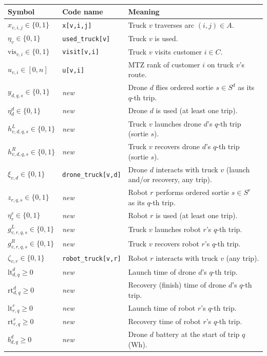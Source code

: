 \documentclass[10pt]{article}
\begin{document}
{\small
\begin{longtable}{@{}p{}p{}p{}@{}}
\toprule
Symbol & Code name & Meaning \\
\midrule
$x_{v,i,j}\in\{0,1\}$ & \texttt{x[v,i,j]} & Truck $v$ traverses arc $(i,j)\in A$. \\
$\eta_v\in\{0,1\}$ & \texttt{used\_truck[v]} & Truck $v$ is used. \\
$\mathrm{vis}_{v,i}\in\{0,1\}$ & \texttt{visit[v,i]} & Truck $v$ visits customer $i\in C$. \\
$u_{v,i}\in[0,n]$ & \texttt{u[v,i]} & MTZ rank of customer $i$ on truck $v$'s route. \\
$y_{d,q,s}\in\{0,1\}$ & \emph{new} & Drone $d$ flies ordered sortie $s\in S^d$ as its $q$-th trip. \\
$\eta^d_d\in\{0,1\}$ & \emph{new} & Drone $d$ is used (at least one trip). \\
$h^L_{v,d,q,s}\in\{0,1\}$ & \emph{new} & Truck $v$ launches drone $d$'s $q$-th trip (sortie $s$). \\
$h^R_{v,d,q,s}\in\{0,1\}$ & \emph{new} & Truck $v$ recovers drone $d$'s $q$-th trip (sortie $s$). \\
$\xi_{v,d}\in\{0,1\}$ & \texttt{drone\_truck[v,d]} & Drone $d$ interacts with truck $v$ (launch and/or recovery, any trip). \\
$z_{r,q,s}\in\{0,1\}$ & \emph{new} & Robot $r$ performs ordered sortie $s\in S^r$ as its $q$-th trip. \\
$\eta^r_r\in\{0,1\}$ & \emph{new} & Robot $r$ is used (at least one trip). \\
$g^L_{v,r,q,s}\in\{0,1\}$ & \emph{new} & Truck $v$ launches robot $r$'s $q$-th trip. \\
$g^R_{v,r,q,s}\in\{0,1\}$ & \emph{new} & Truck $v$ recovers robot $r$'s $q$-th trip. \\
$\zeta_{v,r}\in\{0,1\}$ & \texttt{robot\_truck[v,r]} & Robot $r$ interacts with truck $v$ (any trip). \\
$\mathrm{lt}^d_{d,q}\ge 0$ & \emph{new} & Launch time of drone $d$'s $q$-th trip. \\
$\mathrm{rt}^d_{d,q}\ge 0$ & \emph{new} & Recovery (finish) time of drone $d$'s $q$-th trip. \\
$\mathrm{lt}^r_{r,q}\ge 0$ & \emph{new} & Launch time of robot $r$'s $q$-th trip. \\
$\mathrm{rt}^r_{r,q}\ge 0$ & \emph{new} & Recovery time of robot $r$'s $q$-th trip. \\
$b^d_{d,q}\ge 0$ & \emph{new} & Drone $d$ battery at the start of trip $q$ (Wh). \\

\end{longtable}}
\end{document}
